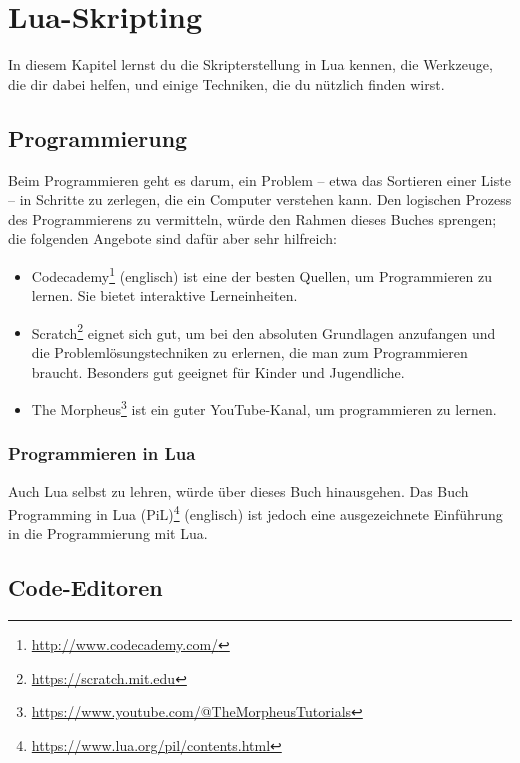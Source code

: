 \chapter{Lua-Skripting}
\label{ch:basics/lua}

In diesem Kapitel lernst du die Skripterstellung in Lua kennen, die
Werkzeuge, die dir dabei helfen, und einige Techniken, die du nützlich
finden wirst.

\section{Programmierung}\label{programmierung}

Beim Programmieren geht es darum, ein Problem -- etwa das Sortieren
einer Liste -- in Schritte zu zerlegen, die ein Computer verstehen kann.
Den logischen Prozess des Programmierens zu vermitteln, würde den Rahmen
dieses Buches sprengen; die folgenden Angebote sind dafür aber sehr
hilfreich:

\begin{itemize}
\tightlist
\item
  Codecademy\footnote{\url{http://www.codecademy.com/}} (englisch) ist
  eine der besten Quellen, um Programmieren zu lernen. Sie bietet
  interaktive Lerneinheiten.
\item
  Scratch\footnote{\url{https://scratch.mit.edu}} eignet sich gut, um
  bei den absoluten Grundlagen anzufangen und die
  Problemlösungstechniken zu erlernen, die man zum Programmieren
  braucht. Besonders gut geeignet für Kinder und Jugendliche.
\item
  The Morpheus\footnote{\url{https://www.youtube.com/@TheMorpheusTutorials}}
  ist ein guter YouTube-Kanal, um programmieren zu lernen.
\end{itemize}

\subsection{Programmieren in Lua}\label{programmieren-in-lua}

Auch Lua selbst zu lehren, würde über dieses Buch hinausgehen. Das Buch
Programming in Lua (PiL)\footnote{\url{https://www.lua.org/pil/contents.html}}
(englisch) ist jedoch eine ausgezeichnete Einführung in die
Programmierung mit Lua.

\section{Code-Editoren}\label{code-editoren}


